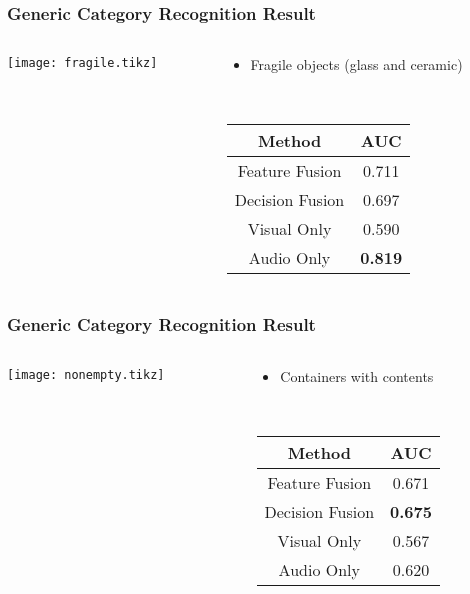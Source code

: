 \documentclass{beamer}
\begin{document}
  \begin{frame}
    \frametitle{Generic Category Recognition Result}

    \begin{columns}
      \begin{column}{.6\linewidth}
        \centering
        \footnotesize
        \texttt{[image: fragile.tikz]}
      \end{column}
      \begin{column}{.4\linewidth}
        \begin{itemize}
          \item Fragile objects (glass and ceramic)
        \end{itemize}
        ~

        \footnotesize
        \begin{tabular}[h]{c|c}
          \hline
          Method & AUC \\ \hline \hline
          Feature Fusion & 0.711 \\ \hline
          Decision Fusion  & 0.697 \\ \hline
          Visual Only & 0.590 \\ \hline
          Audio Only & \textbf{0.819} \\ \hline
        \end{tabular}
      \end{column}
    \end{columns}
  \end{frame}
  \begin{frame}
    \frametitle{Generic Category Recognition Result}

    \begin{columns}
      \begin{column}{.6\linewidth}
        \centering
        \footnotesize
        \texttt{[image: nonempty.tikz]}
      \end{column}
      \begin{column}{.4\linewidth}
        \begin{itemize}
          \item Containers with contents
        \end{itemize}
        ~

        \footnotesize
        \begin{tabular}[h]{c|c}
          \hline
          Method & AUC \\ \hline \hline
          Feature Fusion & 0.671 \\ \hline
          Decision Fusion  & \textbf{0.675} \\ \hline
          Visual Only & 0.567 \\ \hline
          Audio Only & 0.620 \\ \hline
        \end{tabular}
      \end{column}
    \end{columns}
  \end{frame}
\end{document}
